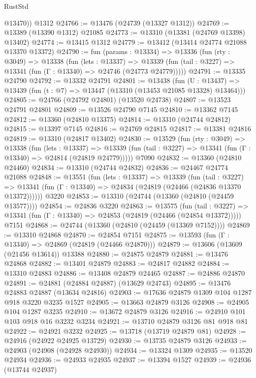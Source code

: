 \begin{lexlean}{RustStd}
\begin{coremodule}
        @13470))
    @1312
@24766 := @13476 (@24739 (@13327 @1312))
@24769 := @13389 (@13390 @1312) @21085
@24773 := @13310 (@13381 (@24769 @13398) @13402)
@24774 := @13415 @1312
@24779 := @13412 (@13414 @24774 @21088 @13370 @13372)
@24790 := fun (params : @13334) =>
  @13336
    (fun (rty : @3049) =>
    @13338
      (fun (lets : @13337) =>
      @13339 (fun (tail : @3227) => @13341 (fun (Γ : @13340) => @24746 (@24773 @24779)))))
@24791 := @13335 @24790
@24792 := @13332 @24791
@24801 := @13438
    (fun (U : @13437) => @13439 (fun (t : @7) => @13447 (@13310 (@13453 @21085 @13328) @13464)))
@24805 := @24766 (@24792 @24801) (@13520 @24738)
@24807 := @13523 @24791 @24801
@24809 := @13526 @24790 @7145
@24810 := @13362 @7145
@24812 := @13360 (@24810 @13375)
@24814 := @13310 (@24744 @24812)
@24815 := @13397 @7145
@24816 := @24769 @24815
@24817 := @13381 @24816
@24819 := @13310 (@24817 @13402)
@24830 := @13529
    (fun (rty : @3049) =>
    @13338
      (fun (lets : @13337) =>
      @13339 (fun (tail : @3227) => @13341 (fun (Γ : @13340) => @24814 (@24819 @24779)))))
    @7090
@24832 := @13360 (@24810 @24460)
@24834 := @13310 (@24744 @24832)
@24836 := @24467 @24774 @21088
@24848 := @13551
    (fun (lets : @13337) =>
    @13339
      (fun (tail : @3227) =>
      @13341 (fun (Γ : @13340) => @24834 (@24819 (@24466 (@24836 @13370 @13372))))))
    @3220
@24853 := @13310 (@24744 (@13360 (@24810 (@24459 @13577))))
@24854 := @24836 @3220
@24863 := @13575
    (fun (tail : @3227) => @13341 (fun (Γ : @13340) => @24853 (@24819 (@24466 (@24854 @13372)))))
    @7151
@24868 := @24744 (@13360 (@24810 (@24459 (@13369 @7152))))
@24869 := @13310 @24868
@24870 := @24854 @7151
@24875 := @13593 (fun (Γ : @13340) => @24869 (@24819 (@24466 @24870)))
@24879 := @13606 (@13609 (@21456 @13614)) @13388
@24880 := @24875 @24879
@24881 := @13476 @24868
@24882 := @13401 @24879
@24883 := @24817 @24882
@24884 := @13310 @24883
@24886 := @13408 @24879 @24465
@24887 := @24886 @24870
@24891 := @24881 (@24884 @24887) (@13629 @24743)
@24895 := @13476 @24883 @24887 (@13634 @24816)
@24903 := @17636 @24879 @1309 @104 @1287 @918 @3220 @3235 @1527
@24905 := @13663 @24879 @3126
@24908 := @24905 @104 @1287 @3235
@24910 := @13672 @24879 @3126
@24916 := @24910 @101 @103 @918 @16 @3232 @3234
@24921 := @13710 @24879 @3126 @81 @918 @81
@24922 := @24921 @3232
@24925 := @13718 (@13719 @24879 @81)
@24928 := @24916 (@24922 @24925 @13729)
@24930 := @13735 @24879 @3126
@24933 := @24903 (@24908 (@24928 @24930))
@24934 := @13324 @1309
@24935 := @13520 @24934
@24936 := @24933 @24935
@24937 := @13394 @1527
@24939 := @24936 (@13744 @24937)

\end{coremodule}
\end{lexlean}
